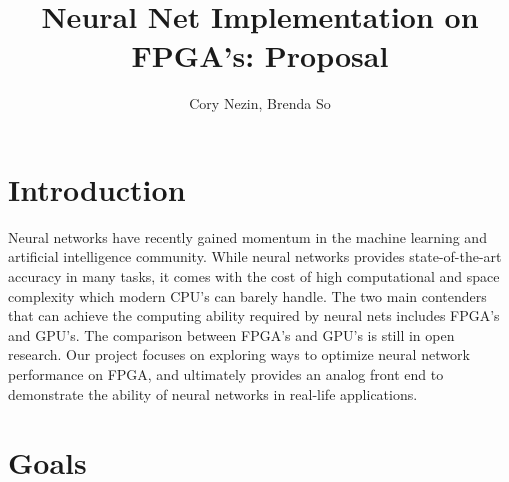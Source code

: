 \documentclass[12pt]{article}
\begin{document}
\title{Neural Net Implementation on FPGA's: Proposal}
\author{Cory Nezin, Brenda So}
\maketitle

\section*{Introduction}

Neural networks have recently gained momentum in the machine learning and artificial intelligence community. While neural networks provides state-of-the-art accuracy in many tasks, it comes with the cost of high computational and space complexity which modern CPU's can barely handle. The two main contenders that can achieve the computing ability required by neural nets includes FPGA's and GPU's. The comparison between FPGA's and GPU's is still in open research. Our project focuses on exploring ways to optimize neural network performance on FPGA, and ultimately provides an analog front end to demonstrate the ability of neural networks in real-life applications.

\section*{Goals}
\end{document}
